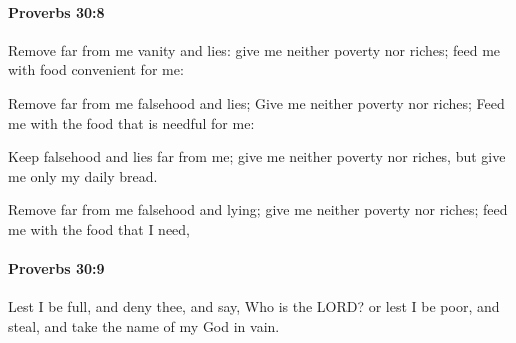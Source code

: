 		\paragraph{Proverbs 30:8} %
			\label{PROVERBS-30-8}

			Remove far from me vanity and lies: give me neither poverty nor riches; feed me with food convenient for me:

			\begin{versebox}
					\item[BHS] 
					\item[ASV] Remove far from me falsehood and lies; Give me neither poverty nor riches; Feed me with the food that is needful for me:
					\item[NIV] Keep falsehood and lies far from me; give me neither poverty nor riches, but give me only my daily bread.
					\item[NRSV] Remove far from me falsehood and lying; give me neither poverty nor riches; feed me with the food that I need,
			\end{versebox}

		\paragraph{Proverbs 30:9} %
			\label{PROVERBS-30-9}

			Lest I be full, and deny thee, and say, Who is the LORD? or lest I be poor, and steal, and take the name of my God in vain.

